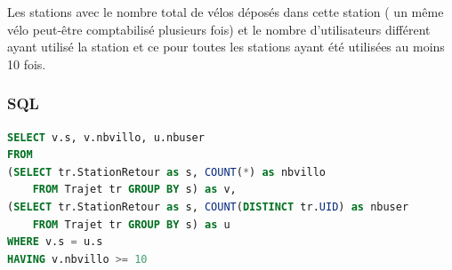 \documentclass[a4paper, 12pt]{report}
\begin{document}
Les stations avec le nombre total de vélos déposés dans cette station ( un même vélo peut-être comptabilisé plusieurs fois) et le nombre d'utilisateurs différent ayant utilisé la station et ce pour toutes les stations ayant été utilisées au moins 10 fois.

\subsubsection*{SQL}
\begin{lstlisting}[language=sql]
SELECT v.s, v.nbvillo, u.nbuser
FROM
(SELECT tr.StationRetour as s, COUNT(*) as nbvillo 
	FROM Trajet tr GROUP BY s) as v,
(SELECT tr.StationRetour as s, COUNT(DISTINCT tr.UID) as nbuser 
	FROM Trajet tr GROUP BY s) as u
WHERE v.s = u.s
HAVING v.nbvillo >= 10
\end{lstlisting}
\end{document}
